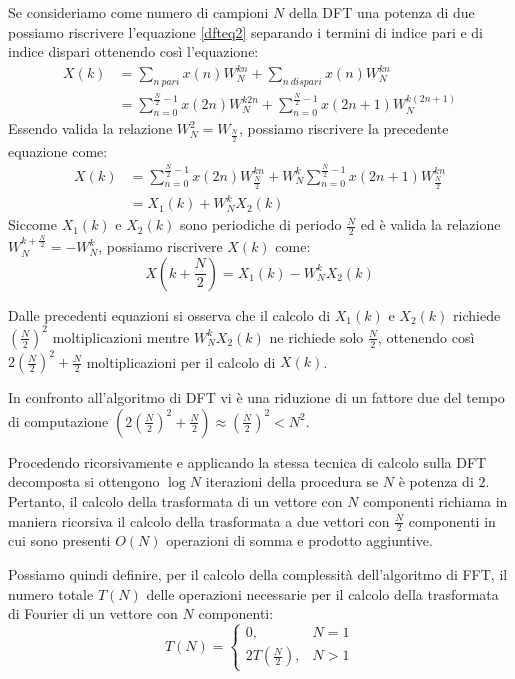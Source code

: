 Se consideriamo come numero di campioni $N$ della DFT una potenza di due possiamo riscrivere l'equazione \ref{dfteq2} separando i termini di indice pari e di indice dispari ottenendo così l'equazione:
\begin{equation}
\begin{split}
	X(k) &= \sum_{n\ pari} x(n)W_{N}^{kn} + \sum_{n\ dispari} x(n)W_{N}^{kn} \\
	&= \sum_{n=0}^{\frac{N}{2}-1} x(2n)W_{N}^{k2n} + \sum_{n=0}^{\frac{N}{2}-1} x(2n+1)W_{N}^{k(2n+1)}
\end{split}
\end{equation}
Essendo valida la relazione $W_N^2=W_{\frac{N}{2}}$, possiamo riscrivere la precedente equazione come:
\begin{equation}
\begin{split}
	X(k) &= \sum_{n=0}^{\frac{N}{2}-1} x(2n)W_{\frac{N}{2}}^{kn} + W_N^k \sum_{n=0}^{\frac{N}{2}-1} x(2n+1)W_{\frac{N}{2}}^{kn}\\
	&= X_1(k) + W_N^k X_2(k)
	\end{split}
\end{equation}
Siccome $X_1(k)$ e $X_2(k)$ sono periodiche di periodo $\frac{N}{2}$ ed è valida la relazione $W_N^{k + \frac{N}{2}}=-W_N^k$, possiamo riscrivere $X(k)$ come:
\begin{equation}
	X \left ( k+\frac{N}{2} \right ) =X_1(k) - W_N^k X_2(k)
\end{equation}

Dalle precedenti equazioni si osserva che il calcolo di $X_1(k)$ e $X_2(k)$ richiede $ \left ( \frac{N}{2} \right ) ^2$ moltiplicazioni mentre $W_N^k X_2(k)$ ne richiede solo $\frac{N}{2}$, ottenendo così $2 \left ( \frac{N}{2} \right ) ^2 + \frac{N}{2}$ moltiplicazioni per il calcolo di $X(k)$.

In confronto all'algoritmo di DFT vi è una riduzione di un fattore due del tempo di computazione $\left ( 2 \left ( \frac{N}{2} \right ) ^2 + \frac{N}{2} \right ) \approx \left ( \frac{N}{2} \right ) ^2  < N^2 $. 

Procedendo ricorsivamente e applicando la stessa tecnica di calcolo sulla DFT decomposta si ottengono $\log N$ iterazioni della procedura se $N$ è potenza di $2$. 
Pertanto, il calcolo della trasformata di un vettore con $N$ componenti richiama in maniera ricorsiva il calcolo della trasformata a due vettori con $\frac{N}{2}$ componenti in cui sono presenti $O(N)$ operazioni di somma e prodotto aggiuntive.  

Possiamo quindi definire, per il calcolo della complessità dell'algoritmo di FFT, il numero totale $T(N)$ delle operazioni necessarie per il calcolo della trasformata di Fourier di un vettore con $N$ componenti:
\begin{equation}
T(N)=
\left\{\begin{matrix}
 0, & N=1 \\ 
 2T \left ( \frac{N}{2} \right ), & N>1
\end{matrix}\right.
\end{equation}

